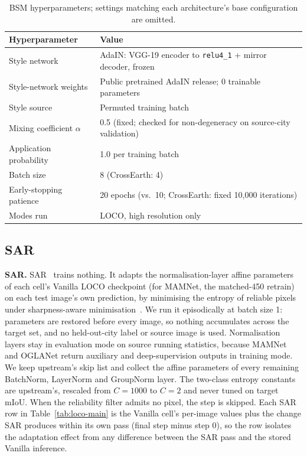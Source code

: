\begin{table}[h]
\centering
\caption{BSM hyperparameters; settings matching each architecture's
base configuration are omitted.}
\label{tab:bsm}
\small
\begin{tabular}{@{}ll@{}}
\toprule
\textbf{Hyperparameter} & \textbf{Value} \\
\midrule
Style network            & AdaIN: VGG-19 encoder to \texttt{relu4\_1} + mirror decoder, frozen \\
Style-network weights    & Public pretrained AdaIN release; 0 trainable parameters \\
Style source             & Permuted training batch \\
Mixing coefficient $\alpha$ & 0.5 (fixed; checked for non-degeneracy on source-city validation) \\
Application probability  & 1.0 per training batch \\
Batch size               & 8 (CrossEarth: 4) \\
Early-stopping patience  & 20 epochs (vs.\ 10; CrossEarth: fixed 10{,}000 iterations) \\
Modes run                & LOCO, high resolution only \\
\bottomrule
\end{tabular}
\end{table}

\subsection{SAR}
\label{sec:sar}

\textbf{SAR.}
SAR~\cite{niu2023sar} trains nothing.  It adapts the normalisation-layer
affine parameters of each cell's Vanilla LOCO checkpoint (for MAMNet,
the matched-450 retrain) on each test image's own prediction, by
minimising the entropy of reliable pixels under sharpness-aware
minimisation~\cite{foret2021sam}.  We run it episodically at batch size
1: parameters are restored before every image, so nothing accumulates
across the target set, and no held-out-city label or source image is
used.  Normalisation layers stay in evaluation mode on source running
statistics, because MAMNet and OGLANet return auxiliary and
deep-supervision outputs in training mode.  We keep upstream's skip list
and collect the affine parameters of every remaining BatchNorm,
LayerNorm and GroupNorm layer.  The two-class entropy constants are
upstream's, rescaled from $C{=}1000$ to $C{=}2$ and never tuned on
target mIoU.  When the reliability filter admits no pixel, the step is
skipped.  Each SAR row in Table~\ref{tab:loco-main} is the Vanilla
cell's per-image values plus the change SAR produces within its own
pass (final step minus step 0), so the row isolates the adaptation
effect from any difference between the SAR pass and the stored Vanilla
inference.

